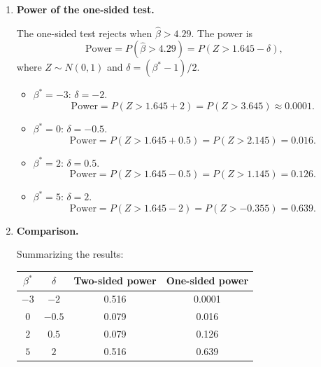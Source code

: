 \documentclass[12pt]{article}
\begin{document}
\begin{enumerate}
\begin{enumerate}
\begin{itemize}
\item $\beta^* = 2$: By symmetry (same distance from $\beta_0 = 1$ as $\beta^* = 0$), Power $= 0.079$.

\item $\beta^* = 5$: By symmetry (same distance from $\beta_0 = 1$ as $\beta^* = -3$), Power $= 0.516$.
\end{itemize}

\bigskip

\item \textbf{Power of the one-sided test.}

The one-sided test rejects when $\hat{\beta} > 4.29$. The power is
$$
\text{Power} = P(\hat{\beta} > 4.29) = P\!\left(Z > 1.645 - \delta\right),
$$
where $Z \sim N(0, 1)$ and $\delta = (\beta^* - 1)/2$.

\begin{itemize}
\item $\beta^* = -3$: $\delta = -2$.
$$
\text{Power} = P(Z > 1.645 + 2) = P(Z > 3.645) \approx 0.0001.
$$

\item $\beta^* = 0$: $\delta = -0.5$.
$$
\text{Power} = P(Z > 1.645 + 0.5) = P(Z > 2.145) = 0.016.
$$

\item $\beta^* = 2$: $\delta = 0.5$.
$$
\text{Power} = P(Z > 1.645 - 0.5) = P(Z > 1.145) = 0.126.
$$

\item $\beta^* = 5$: $\delta = 2$.
$$
\text{Power} = P(Z > 1.645 - 2) = P(Z > -0.355) = 0.639.
$$
\end{itemize}

\bigskip

\item \textbf{Comparison.}

Summarizing the results:

\medskip
\begin{center}
\begin{tabular}{cccc}
\hline
$\beta^*$ & $\delta$ & Two-sided power & One-sided power \\
\hline
$-3$ & $-2$   & 0.516 & 0.0001 \\
$0$  & $-0.5$ & 0.079 & 0.016 \\
$2$  & $0.5$  & 0.079 & 0.126 \\
$5$  & $2$    & 0.516 & 0.639 \\
\hline
\end{tabular}
\end{center}
\medskip


\end{enumerate}
\end{enumerate}
\end{document}

